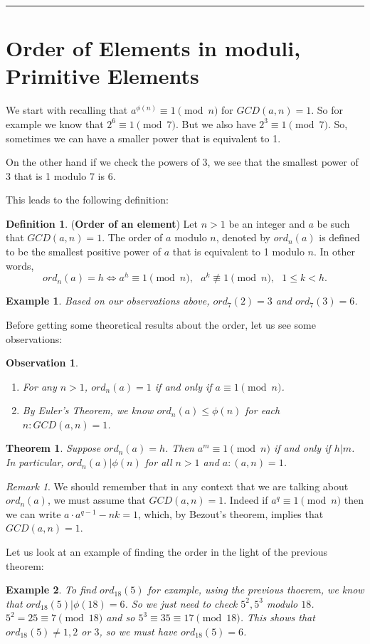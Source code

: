 \documentclass[12pt]{article}
\theoremstyle{plain}
\newtheorem{example}{Example}
\newtheorem{observation}{Observation}
\newtheorem{theorem}{Theorem}
\theoremstyle{definition}
\newtheorem{definition}{Definition}
\theoremstyle{remark}
\newtheorem{remark}{Remark}
\begin{document}
\bigskip
\hrule
\section{Order of Elements in moduli, Primitive Elements}
We start with recalling that $a^{\phi(n)} \equiv 1 \pmod{n}$ for $GCD(a,n)=1$. So for example we know that $2^6 \equiv 1 \pmod{7}$. But we also have $2^3\equiv 1 \pmod{7}$. So, sometimes we can have a smaller power that is equivalent to 1.

On the other hand if we check the powers of 3, we see that the smallest power of 3 that is 1 modulo 7 is 6.

This leads to the following definition:
\begin{definition} ({\bf Order of an element}) Let $n>1$ be an integer and $a$ be such that $GCD(a,n)=1$. The order of $a$ modulo $n$, denoted by $ord_n(a)$ is defined to be the smallest positive power of $a$ that is equivalent to 1 modulo $n$. In other words,
$$ord_n(a)=h \Leftrightarrow a^h \equiv 1 \pmod{n}, \:\:\: a^k\not \equiv 1 \pmod{n}, \:\:\:  1\leq k < h.$$
\end{definition}
\begin{example}
Based on our observations above, $ord_7(2)=3$ and $ord_7(3)=6$.
\end{example}

\bigskip
\noindent
Before getting some theoretical results about the order, let us see some observations:
\begin{observation}
\begin{enumerate}
    \item For any $n>1$, $ord_n(a)=1$ if and only if $a\equiv 1 \pmod{n}$.
    \item By Euler's Theorem, we know $ord_n(a) \leq \phi(n)$ for each $n:GCD(a,n)=1$.
    \end{enumerate}
\end{observation}
\begin{theorem}
Suppose $ord_n(a)=h$. Then $a^m\equiv 1 \pmod{n}$ if and only if $h|m$. In particular, $ord_n(a)|\phi(n)$ for all $n>1$ and $a: (a,n)=1$.
\end{theorem}

\begin{remark}
We should remember that in any context that we are talking about $ord_n(a)$, we must assume that $GCD(a,n)=1$. Indeed if $a^q\equiv 1 \pmod {n}$ then we can write $a\cdot a^{q-1}-nk=1$, which, by Bezout's theorem, implies that $GCD(a,n)=1$.
\end{remark}
Let us look at an example of finding the order in the light of the previous theorem:
\begin{example}
To find $ord_{18}(5)$ for example, using the previous thoerem, we know that $ord_{18}(5)|\phi(18)=6$. So we just need to check $5^2, 5^3$ modulo $18$. $5^2=25 \equiv 7 \pmod{18}$ and so $5^3 \equiv 35 \equiv 17 \pmod{18}$. This shows that $ord_{18}(5)\neq 1, 2$ or $3$, so we must have $ord_{18}(5)=6$.
\end{example}
\end{document}
